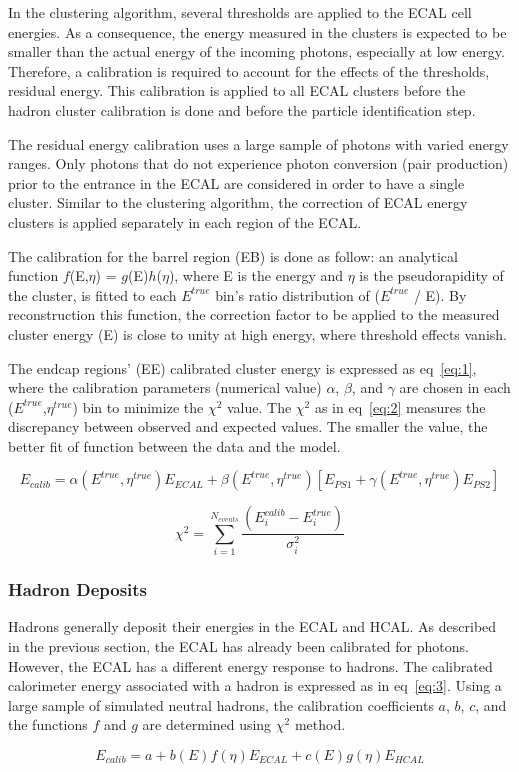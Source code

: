In the clustering algorithm, several thresholds are applied to the ECAL cell energies.%
As a consequence, the energy measured in the clusters is expected to be smaller than the actual energy of the incoming photons, especially at low energy.
Therefore, a calibration is required to account for the effects of the thresholds, residual energy.
This calibration is applied to all ECAL clusters before the hadron cluster calibration is done and before the particle identification step.

The residual energy calibration uses a large sample of photons with varied energy ranges.
Only photons that do not experience photon conversion (pair production) prior to the entrance in the ECAL are considered in order to have a single cluster.
Similar to the clustering algorithm, the correction of ECAL energy clusters is applied separately in each region of the ECAL.

The calibration for the barrel region (EB) is done as follow:  an analytical function $f$(E,$\eta$) = $g$(E)$h$($\eta$), where E is the energy and $\eta$ is the pseudorapidity of the cluster, is fitted to each $E^{true}$ bin's ratio distribution of ($E^{true}$ / E).
By reconstruction this function, the correction factor to be applied to the measured cluster energy (E) is close to unity at high energy, where threshold effects vanish.

The endcap regions' (EE) calibrated cluster energy is expressed as eq~\ref{eq:1},
where the calibration parameters (numerical value) $\alpha$, $\beta$, and $\gamma$ are chosen in each ($E^{true}$,$\eta^{true}$) bin to minimize the $\chi^{2}$ value.
The $\chi^{2}$ as in eq~\ref{eq:2} measures the discrepancy between observed and expected values. The smaller the value, the better fit of function between the data and the model.

\begin{equation}
E_{calib} = \alpha(E^{true},\eta^{true})E_{ECAL} + \beta(E^{true},\eta^{true})[E_{PS1}+\gamma(E^{true},\eta^{true})E_{PS2}]
\label{eq:1}
\end{equation}

\begin{equation}
\chi^{2} = \sum_{i=1}^{N_{events}}\frac{(E_{i}^{calib} - E_{i}^{true})}{\sigma_{i}^{2}}
\label{eq:2}
\end{equation}
\subsubsection{Hadron Deposits}

Hadrons generally deposit their energies in the ECAL and HCAL.
As described in the previous section, the ECAL has already been calibrated for photons.
However, the ECAL has a different energy response to hadrons.
The calibrated calorimeter energy associated with a hadron is expressed as in eq~\ref{eq:3}.
Using a large sample of simulated neutral hadrons, the calibration coefficients $a$, $b$, $c$, and the functions $f$ and $g$ are determined using $\chi^{2}$ method. 

\begin{equation}
E_{calib} = a + b(E)f(\eta)E_{ECAL} + c(E)g(\eta)E_{HCAL}
\label{eq:3}
\end{equation}
